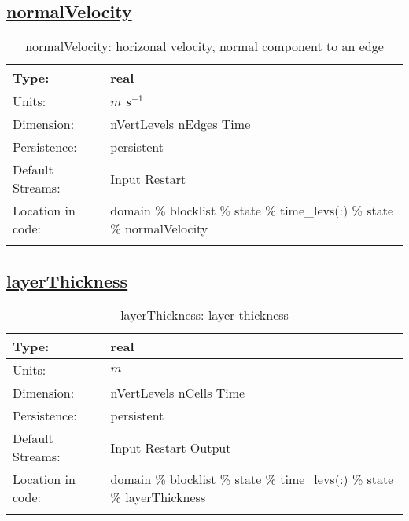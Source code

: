 \subsection[normalVelocity]{\hyperref[sec:var_tab_state]{normalVelocity}}
\label{subsec:var_sec_state_normalVelocity}
\begin{center}
\begin{longtable}{| p{2.0in} | p{4.0in} |}
        \hline 
        Type: & real \\
        \hline 
        Units: & $m$ $s^{-1}$ \\
        \hline 
        Dimension: & nVertLevels nEdges Time \\
        \hline 
        Persistence: & persistent \\
        \hline 
		 Default Streams: & Input Restart  \\
        \hline 
		 Location in code: & domain \% blocklist \% state \% time\_levs(:) \% state \% normalVelocity \\
		 \hline 
    \caption{normalVelocity: horizonal velocity, normal component to an edge}
\end{longtable}
\end{center}
\subsection[layerThickness]{\hyperref[sec:var_tab_state]{layerThickness}}
\label{subsec:var_sec_state_layerThickness}
\begin{center}
\begin{longtable}{| p{2.0in} | p{4.0in} |}
        \hline 
        Type: & real \\
        \hline 
        Units: & $m$ \\
        \hline 
        Dimension: & nVertLevels nCells Time \\
        \hline 
        Persistence: & persistent \\
        \hline 
		 Default Streams: & Input Restart Output  \\
        \hline 
		 Location in code: & domain \% blocklist \% state \% time\_levs(:) \% state \% layerThickness \\
		 \hline 
    \caption{layerThickness: layer thickness}
\end{longtable}
\end{center}
